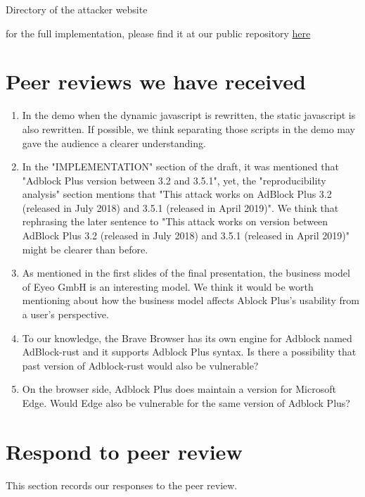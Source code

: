 \documentclass[conference]{IEEEtran}
\begin{document}
\begin{appendices}
Directory of the attacker website


for the full implementation, please find it at our public repository \href{https://github.com/lxylxy123456/14828}{here}

\section{Peer reviews we have received}

\begin{enumerate}
    \item In the demo when the dynamic javascript is rewritten, the static javascript is also rewritten. If possible, we think separating those scripts in the demo may gave the audience a clearer understanding.
    \item In the "IMPLEMENTATION" section of the draft, it was mentioned that "Adblock Plus version between 3.2 and 3.5.1", yet, the "reproducibility analysis" section mentions that "This attack works on AdBlock Plus 3.2 (released in July 2018) and 3.5.1 (released in April 2019)". We think that rephrasing the later sentence to "This attack works on version between AdBlock Plus 3.2 (released in July 2018) and 3.5.1 (released in April 2019)" might be clearer than before.
    \item As mentioned in the first slides of the final presentation, the business model of Eyeo GmbH is an interesting model. We think it would be worth mentioning about how the business model affects Ablock Plus's usability from a user's perspective.
    \item To our knowledge, the Brave Browser has its own engine for Adblock named AdBlock-rust and it supports Adblock Plus syntax. Is there a possibility that past version of Adblock-rust would also be vulnerable?
    \item On the browser side, Adblock Plus does maintain a version for Microsoft Edge. Would Edge also be vulnerable for the same version of Adblock Plus?
\end{enumerate}

\section{Respond to peer review}

This section records our responses to the peer review.


\end{appendices}
\end{document}
